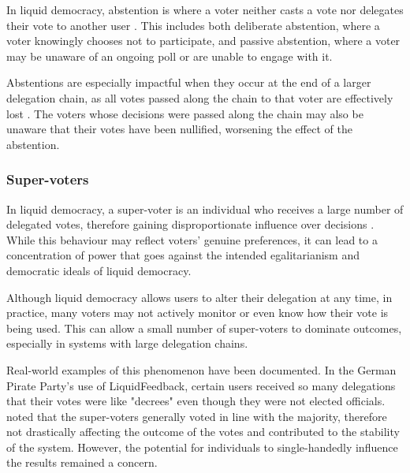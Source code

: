 In liquid democracy, abstention is where a voter neither casts a vote nor delegates their vote to another user \citep{brill_liquid_2022}. This includes both deliberate abstention, where a voter knowingly chooses not to participate, and passive abstention, where a voter may be unaware of an ongoing poll or are unable to engage with it.

Abstentions are especially impactful when they occur at the end of a larger delegation chain, as all votes passed along the chain to that voter are effectively lost \citep{brill_liquid_2022}. The voters whose decisions were passed along the chain may also be unaware that their votes have been nullified, worsening the effect of the abstention.

\subsubsection{Super-voters}
In liquid democracy, a super-voter is an individual who receives a large number of delegated votes, therefore gaining disproportionate influence over decisions \citep{kling2015votingbehaviourpoweronline}. While this behaviour may reflect voters' genuine preferences, it can lead to a concentration of power that goes against the intended egalitarianism and democratic ideals of liquid democracy.

Although liquid democracy allows users to alter their delegation at any time, in practice, many voters may not actively monitor or even know how their vote is being used. This can allow a small number of super-voters to dominate outcomes, especially in systems with large delegation chains.

Real-world examples of this phenomenon have been documented. In the German Pirate Party's use of LiquidFeedback, certain users received so many delegations that their votes were like "decrees" \citep{sven_becker_liquid_2012,kling2015votingbehaviourpoweronline} even though they were not elected officials. \cite{kling2015votingbehaviourpoweronline} noted that the super-voters generally voted in line with the majority, therefore not drastically affecting the outcome of the votes and contributed to the stability of the system. However, the potential for individuals to single-handedly influence the results remained a concern.

